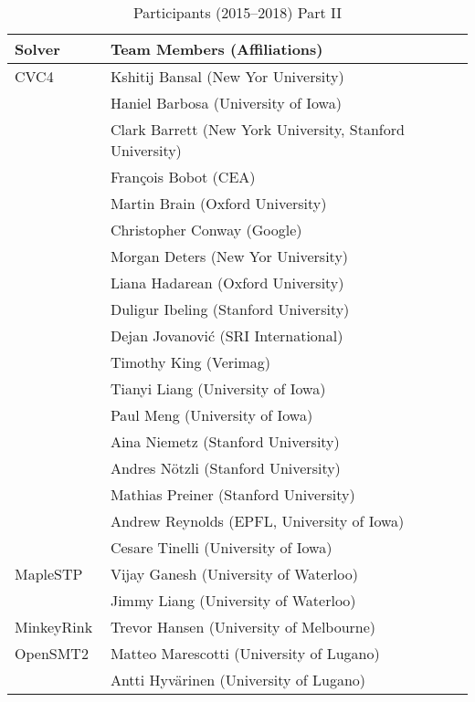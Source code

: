 {  \begin{table}
    \centering
    \caption{Participants (2015--2018) Part II}
    \label{table:participants2}
    \begin{tabular}{ll}
      \toprule
      Solver & Team Members (Affiliations)\\
      \midrule \midrule
      CVC4~\cite{DBLP:conf/cav/BarrettCDHJKRT11}
      & Kshitij Bansal (New Yor University) \\
      & Haniel Barbosa (University of Iowa) \\
      & Clark Barrett (New York University, Stanford University) \\
      & Fran\c{c}ois Bobot (CEA) \\
      & Martin Brain (Oxford University) \\
      & Christopher Conway (Google) \\
      & Morgan Deters (New Yor University) \\
      & Liana Hadarean (Oxford University) \\
      & Duligur Ibeling (Stanford University) \\
      & Dejan Jovanovi\'c (SRI International) \\
      & Timothy King (Verimag) \\
      & Tianyi Liang (University of Iowa) \\
      & Paul Meng (University of Iowa) \\
      & Aina Niemetz (Stanford University) \\
      & Andres N\"otzli (Stanford University) \\
      & Mathias Preiner (Stanford University) \\
      & Andrew Reynolds (EPFL, University of Iowa) \\
      & Cesare Tinelli (University of Iowa)
      \\ \midrule

      MapleSTP
      & Vijay Ganesh (University of Waterloo) \\
      & Jimmy Liang (University of Waterloo)
      \\ \midrule

      MinkeyRink
      & Trevor Hansen (University of Melbourne)
      \\ \midrule

      OpenSMT2~\cite{DBLP:conf/sat/HyvarinenMAS16}
      & Matteo Marescotti (University of Lugano) \\
      & Antti Hyv\"arinen (University of Lugano)
      \\ \midrule


\end{tabular}
\end{table}}
